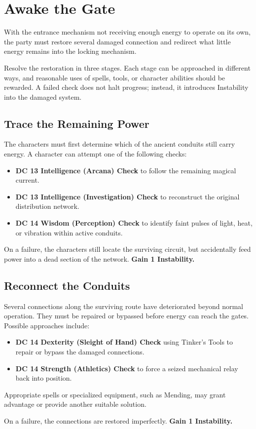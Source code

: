 \section*{ Awake the Gate}
{\entryfont With the entrance mechanism not receiving enough energy to operate on its own, the party must restore several damaged connection and redirect what little energy remains into the locking mechanism.

Resolve the restoration in three stages. Each stage can be approached in different ways, and reasonable uses of spells, tools, or character abilities should be rewarded. A failed check does not halt progress; instead, it introduces Instability into the damaged system.}
\subsection*{Trace the Remaining Power}
{\entryfont The characters must first determine which of the ancient conduits still carry energy. A character can attempt one of the following checks:
\begin{itemize}[label=\textbf{\textbullet}]
	\item \textbf{DC 13 Intelligence (Arcana) Check} to follow the remaining magical current.
	\item \textbf{DC 13 Intelligence (Investigation) Check} to reconstruct the original distribution network.
	\item \textbf{DC 14 Wisdom (Perception) Check} to identify faint pulses of light, heat, or vibration within active conduits.
\end{itemize}
On a failure, the characters still locate the surviving circuit, but accidentally feed power into a dead section of the network. \textbf{Gain 1 Instability.}}
\subsection*{Reconnect the Conduits}
{\entryfont Several connections along the surviving route have deteriorated beyond normal operation. They must be repaired or bypassed before energy can reach the gates. Possible approaches include:
\begin{itemize}[label=\textbf{\textbullet}]
	\item \textbf{DC 14 Dexterity (Sleight of Hand) Check} using Tinker's Tools to repair or bypass the damaged connections.
	\item \textbf{DC 14 Strength (Athletics) Check} to force a seized mechanical relay back into position.
\end{itemize}
Appropriate spells or specialized equipment, such as Mending, may grant advantage or provide another suitable solution.

On a failure, the connections are restored imperfectly. \textbf{Gain 1 Instability.}}
